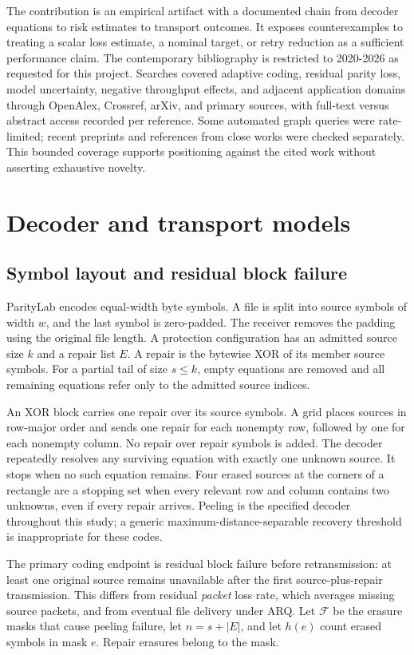 \documentclass[11pt,a4paper]{article}
\begin{document}
The contribution is an empirical artifact with a documented chain from decoder equations to risk estimates to transport outcomes. It exposes counterexamples to treating a scalar loss estimate, a nominal target, or retry reduction as a sufficient performance claim. The contemporary bibliography is restricted to 2020-2026 as requested for this project. Searches covered adaptive coding, residual parity loss, model uncertainty, negative throughput effects, and adjacent application domains through OpenAlex, Crossref, arXiv, and primary sources, with full-text versus abstract access recorded per reference. Some automated graph queries were rate-limited; recent preprints and references from close works were checked separately. This bounded coverage supports positioning against the cited work without asserting exhaustive novelty.

\section{Decoder and transport models}
\subsection{Symbol layout and residual block failure}
ParityLab encodes equal-width byte symbols. A file is split into source symbols of width $w$, and the last symbol is zero-padded. The receiver removes the padding using the original file length. A protection configuration has an admitted source size $k$ and a repair list $E$. A repair is the bytewise XOR of its member source symbols. For a partial tail of size $s\leq k$, empty equations are removed and all remaining equations refer only to the admitted source indices.

An XOR block carries one repair over its source symbols. A grid places sources in row-major order and sends one repair for each nonempty row, followed by one for each nonempty column. No repair over repair symbols is added. The decoder repeatedly resolves any surviving equation with exactly one unknown source. It stops when no such equation remains. Four erased sources at the corners of a rectangle are a stopping set when every relevant row and column contains two unknowns, even if every repair arrives. Peeling is the specified decoder throughout this study; a generic maximum-distance-separable recovery threshold is inappropriate for these codes.

The primary coding endpoint is residual block failure before retransmission: at least one original source remains unavailable after the first source-plus-repair transmission. This differs from residual \emph{packet} loss rate, which averages missing source packets, and from eventual file delivery under ARQ. Let $\mathcal{F}$ be the erasure masks that cause peeling failure, let $n=s+|E|$, and let $h(e)$ count erased symbols in mask $e$. Repair erasures belong to the mask.
\end{document}
